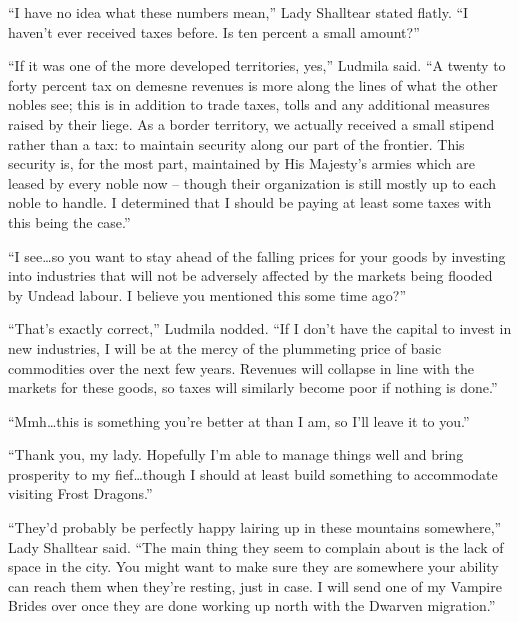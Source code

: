  

“I have no idea what these numbers mean,” Lady Shalltear stated flatly. “I haven’t ever received taxes before. Is ten percent a small amount?”

 

“If it was one of the more developed territories, yes,” Ludmila said. “A twenty to forty percent tax on demesne revenues is more along the lines of what the other nobles see; this is in addition to trade taxes, tolls and any additional measures raised by their liege. As a border territory, we actually received a small stipend rather than a tax: to maintain security along our part of the frontier. This security is, for the most part, maintained by His Majesty’s armies which are leased by every noble now – though their organization is still mostly up to each noble to handle. I determined that I should be paying at least some taxes with this being the case.”

 

“I see…so you want to stay ahead of the falling prices for your goods by investing into industries that will not be adversely affected by the markets being flooded by Undead labour. I believe you mentioned this some time ago?”

 

“That’s exactly correct,” Ludmila nodded. “If I don’t have the capital to invest in new industries, I will be at the mercy of the plummeting price of basic commodities over the next few years. Revenues will collapse in line with the markets for these goods, so taxes will similarly become poor if nothing is done.”

 

“Mmh…this is something you’re better at than I am, so I’ll leave it to you.”

 

“Thank you, my lady. Hopefully I’m able to manage things well and bring prosperity to my fief…though I should at least build something to accommodate visiting Frost Dragons.”

 

“They’d probably be perfectly happy lairing up in these mountains somewhere,” Lady Shalltear said. “The main thing they seem to complain about is the lack of space in the city. You might want to make sure they are somewhere your ability can reach them when they’re resting, just in case. I will send one of my Vampire Brides over once they are done working up north with the Dwarven migration.”

 

